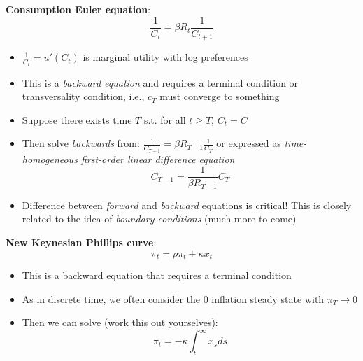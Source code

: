 \documentclass[10pt]{beamer}
\begin{document}
\begin{frame}{}
	\textbf{Consumption Euler equation}:
	\begin{equation*}
		\frac{1}{C_t} = \beta R_t\frac{1}{C_{t+1}}
	\end{equation*}
	\begin{itemize}
		\item $\frac{1}{C_t} = u'(C_t)$ is marginal utility with log preferences
		
		\item This is a \textit{backward equation} and requires a terminal condition or transversality condition, i.e., $c_T$ must converge to something
		
		\item Suppose there exists time $T$ s.t. for all $t \geq T$, $C_t = C$
		
		\item Then solve \textit{backwards} from: $\frac{1}{C_{T-1}} = \beta R_{T-1} \frac{1}{C_T}$ or expressed as \textit{time-homogeneous first-order linear difference equation}
		\begin{equation*}
			C_{T-1} = \frac{1}{\beta R_{T-1}} C_T
		\end{equation*}
		
		\item Difference between \textit{forward} and \textit{backward} equations is critical! This is closely related to the idea of \textit{boundary conditions} (much more to come)
	\end{itemize}
\end{frame}



\begin{frame}{}
	\textbf{New Keynesian Phillips curve}:
	\begin{equation*}
		\dot \pi_t = \rho \pi_t + \kappa x_t
	\end{equation*}
	\begin{itemize}
		\item This is a backward equation that requires a terminal condition
		
		\item As in discrete time, we often consider the $0$ inflation steady state with $\pi_T \to 0$
		
		\item Then we can solve (work this out yourselves):
		\begin{equation*}
			\pi_t = - \kappa \int_t^\infty x_s ds
		\end{equation*}
	\end{itemize}
\end{frame}
\end{document}
